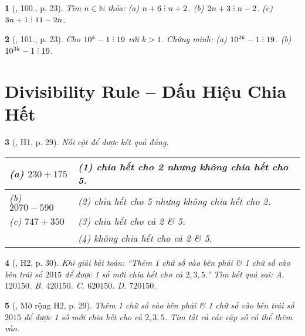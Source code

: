 \documentclass{article}
\newtheorem{baitoan}{}
\DeclareRobustCommand{\divby}{%
	\mathrel{\vbox{\baselineskip.65ex\lineskiplimit0pt\hbox{.}\hbox{.}\hbox{.}}}%
}
\begin{document}
\begin{baitoan}[\cite{Tuyen_Toan_6}, 100., p. 23]
	Tìm $n\in\mathbb{N}$ thỏa: (a) $n + 6\divby n + 2$. (b) $2n + 3\divby n - 2$. (c) $3n + 1\divby11 - 2n$.
\end{baitoan}

\begin{baitoan}[\cite{Tuyen_Toan_6}, 101., p. 23]
	Cho $10^k - 1\divby19$ với $k > 1$. Chứng minh: (a) $10^{2k} - 1\divby19$. (b) $10^{3k} - 1\divby19$.
\end{baitoan}


\section{Divisibility Rule -- Dấu Hiệu Chia Hết}

\begin{baitoan}[\cite{Binh_boi_duong_Toan_6_tap_1}, H1, p. 29]
	Nối cột để được kết quả đúng.
	\begin{table}[H]
		\centering
		\begin{tabular}{|l|l|}
			\hline
			(a) $230 + 175$ & (1) chia hết cho 2 nhưng không chia hết cho 5. \\
			\hline
			(b) $2070 - 590$ & (2) chia hết cho 5 nhưng không chia hết cho 2. \\
			\hline
			(c) $747 + 350$ & (3) chia hết cho cả 2 \& 5. \\
			\hline
			& (4) không chia hết cho cả 2 \& 5. \\
			\hline
		\end{tabular}
	\end{table}
\end{baitoan}

\begin{baitoan}[\cite{Binh_boi_duong_Toan_6_tap_1}, H2, p. 30]
	Khi giải bài toán: ``Thêm 1 chữ số vào bên phải \& 1 chữ số vào bên trái số $2015$ để được 1 số mới chia hết cho cả $2,3,5$.'' Tìm kết quả sai: {\sf A.} $120150$. {\sf B.} $420150$. {\sf C.} $620150$. {\sf D.} $720150$.
\end{baitoan}

\begin{baitoan}[\cite{Binh_boi_duong_Toan_6_tap_1}, Mở rộng H2, p. 29]
	Thêm 1 chữ số vào bên phải \& 1 chữ số vào bên trái số $2015$ để được 1 số mới chia hết cho cả $2,3,5$. Tìm tất cả các cặp số có thể thêm vào.
\end{baitoan}
\end{document}
